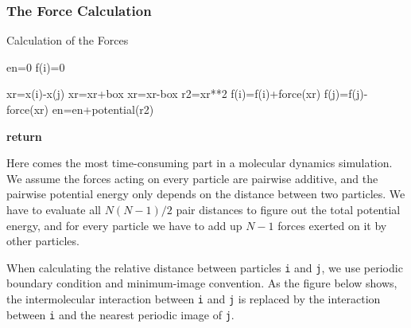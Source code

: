 \documentclass[letterpaper,12pt]{article}
\numberwithin{equation}{section}
\begin{document}
\subsubsection{The Force Calculation}

\begin{algorithm}[H]
    \caption{Calculation of the Forces}
    \begin{algorithmic}[1]


        \State en=0
            \State f(i)=0  
        \EndFor
    \EndProcedure
    
              
                \State xr=x(i)-x(j)
                    \State xr=xr+box  
                \EndIf
                    \State xr=xr-box  
                \EndIf
                \State r2=xr**2
                  
                    \State f(i)=f(i)+force(xr)
                    \State f(j)=f(j)-force(xr)  
                    \State en=en+potential(r2) 
                \EndIf
            \EndFor
        \EndFor
    \EndProcedure

    \State \textbf{return}
    \EndFunction
    \end{algorithmic}
\end{algorithm}

Here comes the most time-consuming part in a molecular dynamics simulation. We assume the forces acting on every particle are pairwise additive, and the pairwise potential energy only depends on the distance between two particles. We have to evaluate all $N(N-1)/2$ pair distances to figure out the total potential energy, and for every particle we have to add up $N-1$ forces exerted on it by other particles.

When calculating the relative distance between particles \texttt{i} and \texttt{j}, we use periodic boundary condition and minimum-image convention. As the figure below shows, the intermolecular interaction between \texttt{i} and \texttt{j} is replaced by the interaction between \texttt{i} and the nearest periodic image of \texttt{j}. 
\end{document}
